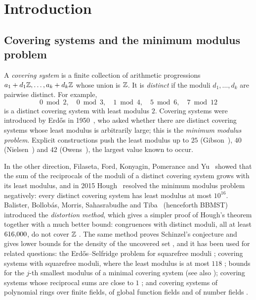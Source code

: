 \section{Introduction}\label{sec:intro}

\subsection{Covering systems and the minimum modulus problem}

A \emph{covering system} is a finite collection of arithmetic progressions $a_1+d_1\mathbb{Z},\dots,a_k+d_k\mathbb{Z}$ whose union
is $\mathbb{Z}$. It is \emph{distinct} if the moduli $d_1,\dots,d_k$ are pairwise distinct. For example,
\[
  0 \bmod 2,\quad 0 \bmod 3,\quad 1 \bmod 4,\quad 5 \bmod 6,\quad 7 \bmod 12
\]
is a distinct covering system with least modulus $2$. Covering systems were introduced by Erd\H{o}s in
1950~\cite{Erdos1950}, who asked whether there are distinct covering systems whose least modulus is arbitrarily
large; this is the \emph{minimum modulus problem}. Explicit constructions push the least modulus up to
$25$ (Gibson~\cite{Gibson2009}), $40$ (Nielsen~\cite{Nielsen2009}) and $42$ (Owens~\cite{Owens2014}), the largest
value known to occur.

In the other direction, Filaseta, Ford, Konyagin, Pomerance and Yu~\cite{FFKPY2007} showed that the sum of the
reciprocals of the moduli of a distinct covering system grows with its least modulus, and in 2015
Hough~\cite{Hough2015} resolved the minimum modulus problem negatively: every distinct covering system has least
modulus at most $10^{16}$. Balister, Bollob\'as, Morris, Sahasrabudhe and Tiba~\cite{BBMST} (henceforth BBMST)
introduced the \emph{distortion method}, which gives a simpler proof of Hough's theorem together with a much
better bound: congruences with distinct moduli, all at least $616{,}000$, do not cover $\mathbb{Z}$
\cite[Theorem~8.1]{BBMST}. The same method proves Schinzel's conjecture and gives lower bounds for the density of
the uncovered set \cite{BBMST}, and it has been used for related questions: the Erd\H{o}s--Selfridge problem for
squarefree moduli \cite{BBMST2021ES}; covering systems with squarefree moduli, where the least modulus is at most
$118$ \cite{CFT2025}; bounds for the $j$-th smallest modulus of a minimal covering system \cite{KKL2024} (see also
\cite{CFT2025}); covering systems whose reciprocal sums are close to $1$ \cite{FilasetaKalogirou2026}; and covering
systems of polynomial rings over finite fields, of global function fields and of number fields
\cite{LWWY2024,LWWY2025,BWang2026,LiWangYi2026}.

